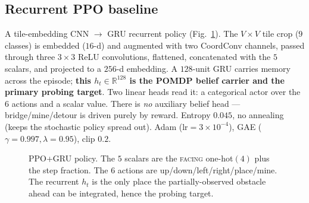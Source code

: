 \documentclass[11pt]{article}
\begin{document}
\subsection{Recurrent PPO baseline}
A tile-embedding CNN $\to$ GRU recurrent policy (Fig.~\ref{fig:ppo}). The
$V{\times}V$ tile crop ($9$ classes) is embedded ($16$-d) and augmented with two
CoordConv channels, passed through three $3{\times}3$ ReLU convolutions, flattened,
concatenated with the $5$ scalars, and projected to a $256$-d embedding. A
$128$-unit GRU carries memory across the episode; \textbf{this $h_t\in\mathbb{R}^{128}$
is the POMDP belief carrier and the primary probing target}. Two linear heads read
it: a categorical actor over the $6$ actions and a scalar value. There is \emph{no}
auxiliary belief head --- bridge/mine/detour is driven purely by reward. Entropy
$0.045$, no annealing (keeps the stochastic policy spread out). Adam
($\text{lr}=3\!\times\!10^{-4}$), GAE ($\gamma{=}0.997,\lambda{=}0.95$), clip $0.2$.

\begin{figure}[H]
\centering
{}
\caption{PPO+GRU policy. The $5$ scalars are the \textsc{facing} one-hot$(4)$ plus
the step fraction. The $6$ actions are up/down/left/right/\textsf{place}/\textsf{mine}.
The recurrent $h_t$ is the only place the partially-observed obstacle ahead can be
integrated, hence the probing target.}
\label{fig:ppo}
\end{figure}
\end{document}
